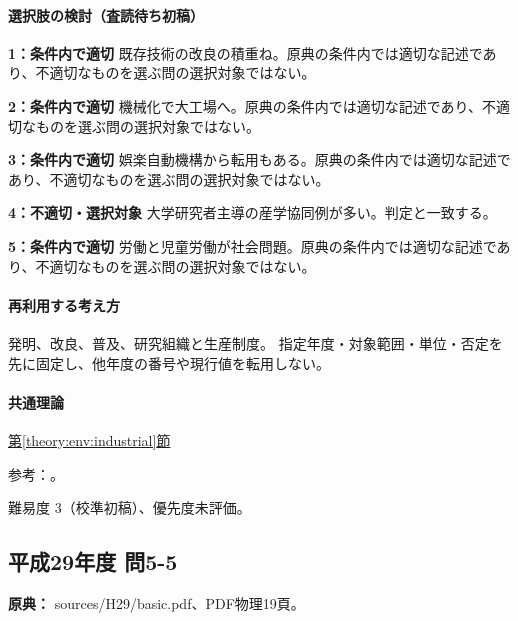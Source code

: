 \paragraph{選択肢の検討（査読待ち初稿）}\mbox{}\par

\noindent\textbf{1：条件内で適切} 既存技術の改良の積重ね。原典の条件内では適切な記述であり、不適切なものを選ぶ問の選択対象ではない。\par

\noindent\textbf{2：条件内で適切} 機械化で大工場へ。原典の条件内では適切な記述であり、不適切なものを選ぶ問の選択対象ではない。\par

\noindent\textbf{3：条件内で適切} 娯楽自動機構から転用もある。原典の条件内では適切な記述であり、不適切なものを選ぶ問の選択対象ではない。\par

\noindent\textbf{4：不適切・選択対象} 大学研究者主導の産学協同例が多い。判定と一致する。\par

\noindent\textbf{5：条件内で適切} 労働と児童労働が社会問題。原典の条件内では適切な記述であり、不適切なものを選ぶ問の選択対象ではない。\par

\paragraph{再利用する考え方} 発明、改良、普及、研究組織と生産制度。 指定年度・対象範囲・単位・否定を先に固定し、他年度の番号や現行値を転用しない。

\paragraph{共通理論} \hyperref[theory:env:industrial]{第\ref*{theory:env:industrial}節}

\par 参考：\cite{env58_steam}。

\par 難易度 3（校準初稿）、優先度未評価。

\subsection{平成29年度 問5-5}
\label{q:h29-reg-basic-5-5}

\noindent\textbf{原典：} sources/H29/basic.pdf、PDF物理19頁。

